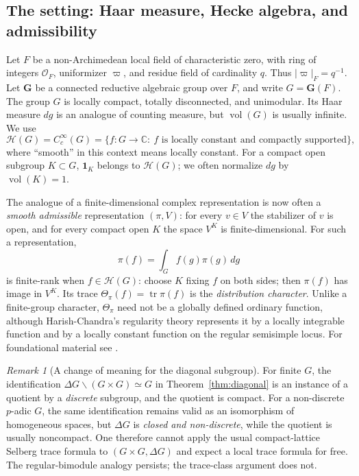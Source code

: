 \documentclass[12pt]{article}
\theoremstyle{remark}
\newtheorem{remark}[theorem]{Remark}
\newcommand{\C}{\mathbb C}
\begin{document}
\subsection{The setting: Haar measure, Hecke algebra, and admissibility}
Let $F$ be a non-Archimedean local field of characteristic zero, with
ring of integers $\mathcal O_F$, uniformizer $\varpi$, and residue
field of cardinality $q$.  Thus $|\varpi|_F=q^{-1}$.  Let
$\mathbf G$ be a connected reductive algebraic group over $F$, and
write $G=\mathbf G(F)$.  The group $G$ is locally compact,
totally disconnected, and unimodular.  Its Haar measure $dg$ is an
analogue of counting measure, but $\operatorname{vol}(G)$ is usually
infinite.  We use
\[
 \mathcal H(G)=C_c^\infty(G)
 =\{f:G\longrightarrow\C:\ f\text{ is locally constant and
 compactly supported}\},
\]
where ``smooth'' in this context means locally constant. For a
compact open subgroup $K\subset G$, $\mathbf 1_K$ belongs to
$\mathcal H(G)$; we often normalize $dg$ by
$\operatorname{vol}(K)=1$.

The analogue of a finite-dimensional complex representation is now
often a \emph{smooth admissible} representation $(\pi,V)$:
for every $v\in V$ the stabilizer of $v$ is open, and for every
compact open $K$ the space $V^K$ is finite-dimensional. For such a
representation,
\[
 \pi(f)=\int_G f(g)\pi(g)\,dg
\]
is finite-rank when $f\in\mathcal H(G)$: choose $K$ fixing $f$ on
both sides; then $\pi(f)$ has image in $V^K$. Its trace
$\Theta_\pi(f)=\operatorname{tr}\pi(f)$ is the
\emph{distribution character}. Unlike a finite-group character,
$\Theta_\pi$ need not be a globally defined ordinary function,
although Harish-Chandra's regularity theory represents it by a
locally integrable function and by a locally constant function on
the regular semisimple locus.  For foundational material see
\cite{Casselman1995,Silberger1979}.

\begin{remark}[A change of meaning for the diagonal subgroup]
For finite $G$, the identification
$\Delta G\backslash(G\times G)\simeq G$ in
Theorem~\ref{thm:diagonal} is an instance of a quotient by a
\emph{discrete} subgroup, and the quotient is compact. For a
non-discrete $p$-adic $G$, the same identification remains valid
as an isomorphism of homogeneous spaces, but $\Delta G$ is
\emph{closed and non-discrete}, while the quotient is usually
noncompact. One therefore cannot apply the usual compact-lattice
Selberg trace formula to $(G\times G,\Delta G)$ and expect a
local trace formula for free. The regular-bimodule analogy persists;
the trace-class argument does not.
\end{remark}
\end{document}
